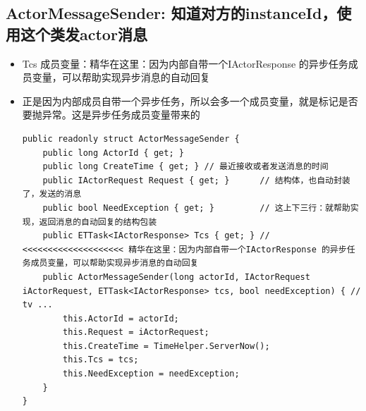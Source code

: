 \documentclass[9pt, b5paper]{article}
\begin{document}
\subsection{ActorMessageSender: 知道对方的instanceId，使用这个类发actor消息}
\label{sec-2-1}
\begin{itemize}
\item Tcs 成员变量：精华在这里：因为内部自带一个IActorResponse 的异步任务成员变量，可以帮助实现异步消息的自动回复
\item 正是因为内部成员自带一个异步任务，所以会多一个成员变量，就是标记是否要抛异常。这是异步任务成员变量带来的
\begin{verbatim}
public readonly struct ActorMessageSender {
    public long ActorId { get; }
    public long CreateTime { get; } // 最近接收或者发送消息的时间
    public IActorRequest Request { get; }      // 结构体，也自动封装了，发送的消息
    public bool NeedException { get; }         // 这上下三行：就帮助实现，返回消息的自动回复的结构包装
    public ETTask<IActorResponse> Tcs { get; } // <<<<<<<<<<<<<<<<<<<< 精华在这里：因为内部自带一个IActorResponse 的异步任务成员变量，可以帮助实现异步消息的自动回复
    public ActorMessageSender(long actorId, IActorRequest iActorRequest, ETTask<IActorResponse> tcs, bool needException) { // tv ... 
        this.ActorId = actorId;
        this.Request = iActorRequest;
        this.CreateTime = TimeHelper.ServerNow();
        this.Tcs = tcs;
        this.NeedException = needException;
    }
}
\end{verbatim}
\end{itemize}
\end{document}
